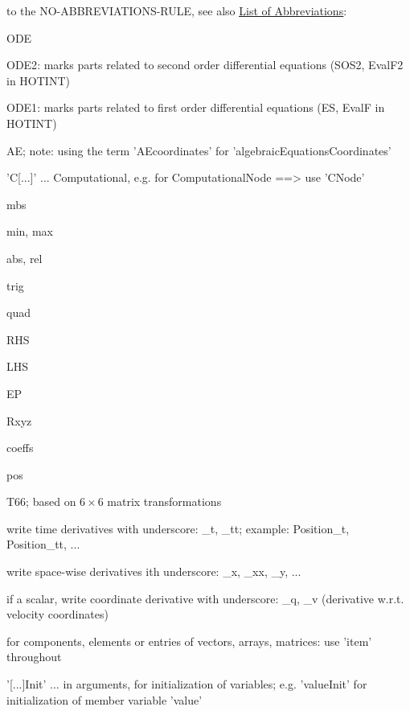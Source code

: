  to the NO-ABBREVIATIONS-RULE, see also \hyperref[sec:listOfAbbreviations]{\underline{List of Abbreviations}}: %
\bi
    \item \ac{ODE}
    \item \ac{ODE2}: marks parts related to second order differential equations (SOS2, EvalF2 in HOTINT)
    \item \ac{ODE1}: marks parts related to first order differential equations (ES, EvalF in HOTINT)
    \item \ac{AE}; note: using the term 'AEcoordinates' for 'algebraicEquationsCoordinates'
    \item 'C[...]' ... Computational, e.g. for ComputationalNode ==> use 'CNode'
    \item \ac{mbs}
    \item \ac{min}, \ac{max}
    \item \ac{abs}, \ac{rel}
    \item \ac{trig} 
    \item \ac{quad}
    \item \ac{RHS}
    \item \ac{LHS}
    \item \ac{EP}
    \item \ac{Rxyz}%
    \item \ac{coeffs}
    \item \ac{pos}
    \item \ac{T66}; based on $6\times 6$ matrix transformations
    \item write time derivatives with underscore: \_t, \_tt; example: Position\_t, Position\_tt, ...
    \item write space-wise derivatives ith underscore: \_x, \_xx, \_y, ...
    \item if a scalar, write coordinate derivative with underscore: \_q, \_v (derivative w.r.t. velocity coordinates)
    \item for components, elements or entries of vectors, arrays, matrices: use 'item' throughout
    \item '[...]Init' ... in arguments, for initialization of variables; e.g. 'valueInit' for initialization of member variable 'value'
\ei



